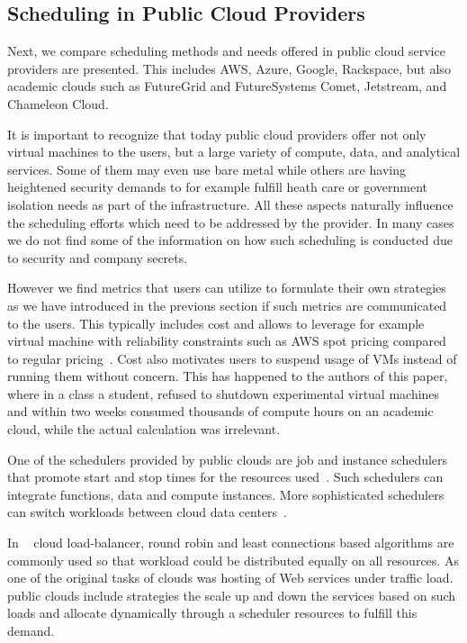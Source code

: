\documentclass[final,5p,times,twocolumn]{elsarticle}
\begin{document}
\subsection{Scheduling in Public Cloud Providers}
\label{sec:public}



Next, we compare scheduling methods and needs offered in public cloud
service providers are presented. This includes AWS, Azure, Google,
Rackspace, but also academic clouds such as FutureGrid and
FutureSystems Comet, Jetstream, and Chameleon Cloud.

It is important to recognize that today public cloud providers offer
not only virtual machines to the users, but a large variety of
compute, data, and analytical services. Some of them may even use bare
metal while others are having heightened security demands to for
example fulfill heath care or government isolation needs as part of
the infrastructure. All these aspects naturally influence the
scheduling efforts which need to be addressed by the provider. In many
cases we do not find some of the information on how such scheduling is
conducted due to security and company secrets.

However we find metrics that users can utilize to formulate their own
strategies as we have introduced in the previous section if such
metrics are communicated to the users. This typically includes cost
and allows to leverage for example virtual machine with reliability
constraints such as AWS spot pricing compared to regular
pricing~\cite{AmazonEC22015}.  Cost also motivates users to suspend
usage of VMs instead of running them without concern. This has
happened to the authors of this paper, where in a class a student,
refused to shutdown experimental virtual machines and within two weeks
consumed thousands of compute hours on an academic cloud, while the
actual calculation was irrelevant.

One of the schedulers provided by public clouds are job and instance
schedulers that promote start and stop times for the resources
used~\cite{AWSIns2019,AzureSch2019,Rackspace2016,GoogleAppEngine2018}. Such
schedulers can integrate functions, data and compute instances. More
sophisticated schedulers can switch workloads between cloud data
centers~\cite{MicrosoftAzure2014}.

In ~\cite{Rackspace2016} cloud load-balancer, round robin and least
connections based algorithms are commonly used so that workload could
be distributed equally on all resources.  As one of the original tasks
of clouds was hosting of Web services under traffic load. public
clouds include strategies the scale up and down the services based on
such loads and allocate dynamically through a scheduler resources to
fulfill this demand.
\end{document}

